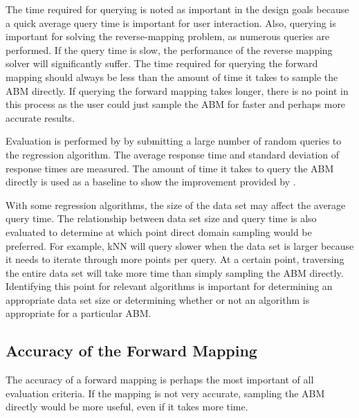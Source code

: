 The time required for querying is noted as important in the design goals because
a quick average query time is important for user interaction.
Also, querying is important for solving the reverse-mapping problem, as numerous queries are performed.
If the query time is slow, the performance of the reverse mapping solver will significantly suffer.
The time required for querying the forward mapping should always be less than the amount of time it takes to sample the ABM directly.
If querying the forward mapping takes longer, there is no point in this process as the user could just sample the ABM for faster and perhaps more accurate results.

Evaluation is performed by by submitting a large number of random queries to the regression algorithm.
The average response time and standard deviation of response times are measured.
The amount of time it takes to query the ABM directly is used as a baseline to show the improvement provided by \fw.


With some regression algorithms, the size of the data set may affect the average query time.
The relationship between data set size and query time is also evaluated to determine at which point direct domain sampling would be preferred.
For example, kNN will query slower when the data set is larger because it needs to iterate through more points per query.
At a certain point, traversing the entire data set will take more time than simply sampling the ABM directly.
Identifying this point for relevant algorithms is important for determining an appropriate data set size or determining whether or not an algorithm is appropriate for a particular ABM.

\subsection{Accuracy of the Forward Mapping}
The accuracy of a forward mapping is perhaps the most important of all evaluation criteria.
If the mapping is not very accurate, sampling the ABM directly would be more useful, even if it takes more time.

